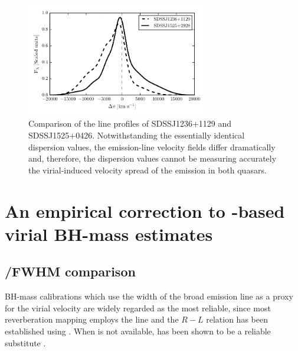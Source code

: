 \begin{figure}
    \includegraphics[width=8cm]{figures/chapter02/civ_comparison.pdf} 
    \caption{Comparison of the  line profiles of SDSSJ1236+1129 and SDSSJ1525+0426. Notwithstanding the essentially identical dispersion values, the emission-line velocity fields differ dramatically and, therefore, the dispersion values cannot be measuring accurately the virial-induced velocity spread of the  emission in both quasars. }
    \label{fig:civ_comparison}
\end{figure}

\section{An empirical correction to -based virial BH-mass estimates}

\subsection{\hans/\hb FWHM comparison}
\label{sec:hahbcomparison}

BH-mass calibrations which use the width of the broad \hb emission line as a proxy for the virial velocity are widely regarded as the most reliable, since most reverberation mapping employs the \hb line and the $R-L$ relation has been established using \hbns.
When \hb is not available, \ha has been shown to be a reliable substitute \citep[e.g.][]{greene05,shen11,shen12}. 

